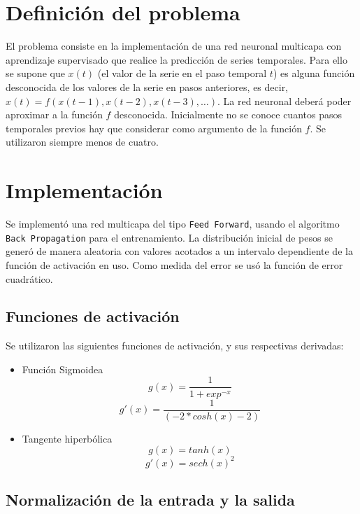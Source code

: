 \documentclass[a4paper,10pt]{article}
\begin{document}
\setcounter{page}{1}


\section{Definición del problema}

El problema consiste en la implementación de una red neuronal multicapa con aprendizaje supervisado que realice la predicción de series temporales. Para ello se supone que $x(t)$ (el valor de la 
serie en el paso temporal $t$) es alguna función desconocida de los valores de la serie en pasos anteriores, es decir, $x(t) = f (x(t - 1), x(t - 2), x(t - 3), \dots)$. 
La red neuronal deberá poder aproximar a la función $f$ desconocida. Inicialmente no se conoce cuantos pasos temporales previos hay que considerar como argumento 
de la función $f$. Se utilizaron siempre menos de cuatro.

\section{Implementación}

    Se implementó una red multicapa del tipo \texttt{Feed Forward}, usando el algoritmo \texttt{Back Propagation} para el entrenamiento. La distribución inicial de pesos 
    se generó de manera aleatoria con valores acotados a un intervalo dependiente de la función de activación en uso. Como medida del error se usó la función de error cuadrático.

    \subsection{Funciones de activación}
    Se utilizaron las siguientes funciones de activación, y sus respectivas derivadas:

    \begin{itemize}
        \item Función Sigmoidea
            \[ g(x) = \dfrac{1}{1 + exp^{-x}} \]
            \[ g'(x) = \dfrac{1}{(-2 * cosh(x) - 2)}\]
        \item Tangente hiperbólica
            \[ g(x) = tanh(x) \]
            \[ g'(x) = sech(x)^{2} \]
    \end{itemize}

    \subsection{Normalización de la entrada y la salida}
\end{document}
